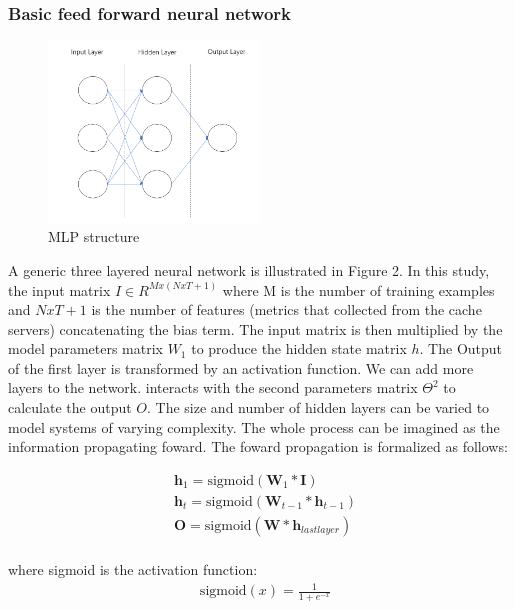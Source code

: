 \documentclass[5p]{elsarticle}
\begin{document}
\subsubsection{Basic feed forward neural network}
\begin{figure}[h]
    \centering
    \includegraphics[width=0.5\textwidth]{mlp.png}
    \caption{MLP structure}
    \label{fig:RNN}
\end{figure}

A generic three layered neural network is illustrated in Figure 2. In this study, the input matrix $I \in R^{Mx(NxT+1)}$  where M is the number of training examples and $NxT+1$ is the number of features (metrics that collected from the cache servers) concatenating the bias term. The input matrix is then multiplied by the model parameters matrix $W_1$ to produce the hidden state matrix $h$. The Output of the first layer is transformed by an activation function. We can add more layers to the network. interacts with the second parameters matrix $\Theta^2$ to calculate the output $O$. The size and number of hidden layers can be varied to model systems of varying complexity. The whole process can be imagined as the information propagating foward. The foward propagation is formalized as follows:

\begin{equation}
    \begin{split}
    & \mathbf h_1 = \text{sigmoid}(\mathbf W_1 * \mathbf I) \\
    & \mathbf h_t = \text{sigmoid}(\mathbf W_{t-1} * \mathbf h_{t-1}) \\
    & \mathbf O=\text{sigmoid}(\mathbf W * \mathbf h_{lastlayer}) \\
    \end{split}
\end{equation}

where sigmoid is the activation function:
\begin{equation}
    \begin{split}
    & \text{sigmoid}(x)=\frac{1}{1+e^{-x}}
    \end{split}
\end{equation}
\end{document}
